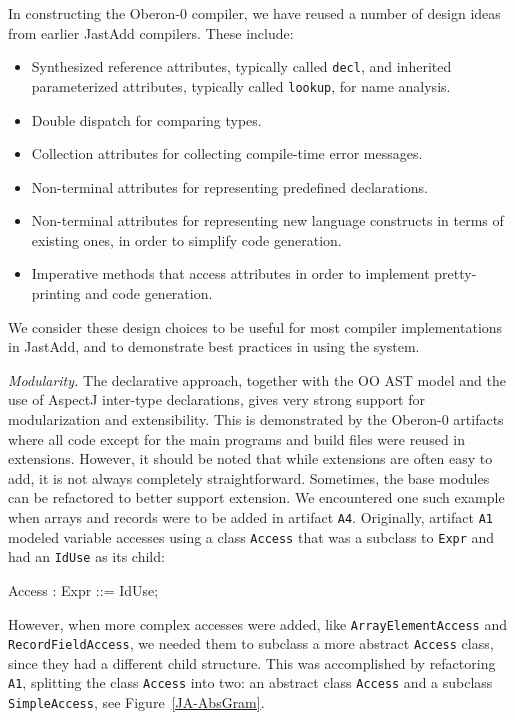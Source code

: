 In constructing the Oberon-0 compiler, we have reused a number of design ideas from earlier JastAdd compilers. These include:
\begin{itemize}
  \item Synthesized reference attributes, typically called \texttt{decl}, and inherited parameterized attributes, typically called \texttt{lookup}, for name analysis.
  \item Double dispatch for comparing types.
  \item Collection attributes for collecting compile-time error messages.
  \item Non-terminal attributes for representing predefined declarations.
  \item Non-terminal attributes for representing new language constructs in terms of existing ones, in order to simplify code generation.
  \item Imperative methods that access attributes in order to implement pretty-printing and code generation.
\end{itemize}
We consider these design choices to be useful for most compiler implementations in JastAdd, and to demonstrate best practices in using the system.

\emph{Modularity.}
The declarative approach, together with the OO AST model and the use of AspectJ inter-type declarations, gives very strong support for modularization and extensibility. This is demonstrated by the Oberon-0 artifacts where all code except for the main programs and build files were reused in extensions. However, it should be noted that while extensions are often easy to add, it is not always completely straightforward. Sometimes, the base modules can be refactored to better support extension. We encountered one such example when arrays and records were to be added in artifact \texttt{A4}. Originally, artifact \texttt{A1} modeled variable accesses using a class \texttt{Access} that was a subclass to \texttt{Expr} and had an \texttt{IdUse} as its child:

\begin{jastaddcode}
Access : Expr ::= IdUse;
\end{jastaddcode}

However, when more complex accesses were added, like \texttt{ArrayElementAccess} and \texttt{RecordFieldAccess}, we needed them to subclass a more abstract \texttt{Access} class, since they had a different child structure. This was accomplished by refactoring \texttt{A1}, splitting the class \texttt{Access} into two: an abstract class \texttt{Access} and a subclass \texttt{SimpleAccess}, see Figure~\ref{JA-AbsGram}.

